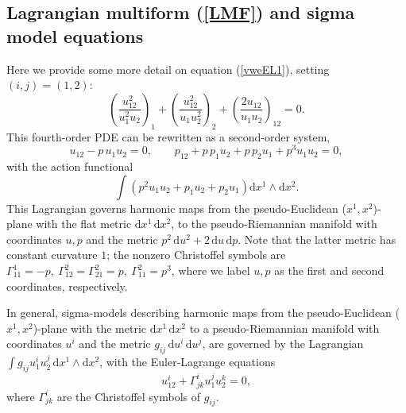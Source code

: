 \documentclass[12pt, a4paper]{article}
\theoremstyle{definition}
\renewcommand{\d}{\mathrm{d}}
\begin{document}
\subsection{Lagrangian multiform (\ref{LMF}) and  sigma model equations}
\label{app-sigma}

Here we provide some more detail on equation (\ref{vweEL1}), setting $(i, j)=(1, 2)$:
$$
\left(\frac{u_{12}^2}{u_1^2u_2}\right)_1+\left(\frac{u_{12}^2}{u_1u_2^2}\right)_2+\left(\frac{2u_{12}}{u_1u_2}\right)_{12}=0.
$$
This fourth-order PDE can be rewritten as a second-order system,
$$
u_{12}-p\,u_1u_2=0, \qquad p_{12}+p\,p_1u_2+p\,p_2u_1+p^3u_1u_2=0,
$$
with the action functional
$$
\int \left( p^2u_1u_2+p_1u_2+p_2u_1 \right) \d x^1\wedge \d x^2.
$$
This Lagrangian governs harmonic maps from the pseudo-Euclidean ($x^1, x^2$)-plane with  the flat metric $\d x^1 \, \d x^2$, to the pseudo-Riemannian manifold with coordinates $u, p$ and the metric $p^2 \, \d u^2 + 2 \, \d u \, \d p$. Note that the latter metric has constant curvature $1$; the nonzero Christoffel symbols are $\Gamma^1_{11}=-p, \ \Gamma^2_{12}=\Gamma^2_{21}=p, \ \Gamma^2_{11}=p^3$, where we label $u, p$ as the first and second coordinates, respectively. 

In general,  sigma-models describing harmonic maps from the pseudo-Euclidean ($x^1, x^2$)-plane with  the metric $\d x^1 \, \d x^2$ to a pseudo-Riemannian manifold with coordinates $u^i$ and the metric $g_{ij} \, \d u^i \, \d u^j$, are governed by the Lagrangian $\int g_{ij}u^i_1u^j_2 \, \d x^1\wedge \d x^2$, with the Euler-Lagrange equations
$$
u^i_{12}+\Gamma^i_{jk}u^j_1u^k_2=0,
$$
where $\Gamma^i_{jk}$ are the Christoffel symbols of $g_{ij}$.




\end{document}
